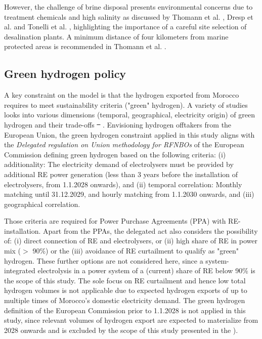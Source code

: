 \documentclass[5p,numafflabel]{elsarticle}
\providecommand{\DIFaddtex}[1]{{\protect\color{blue}\uwave{#1}}} %
\providecommand{\DIFdeltex}[1]{{\protect\color{red}\sout{#1}}}                      %
\providecommand{\DIFaddbegin}{} %
\providecommand{\DIFaddend}{} %
\providecommand{\DIFdelbegin}{} %
\providecommand{\DIFdelend}{} %
\providecommand{\DIFadd}[1]{\texorpdfstring{\DIFaddtex{#1}}{#1}} %
\providecommand{\DIFdel}[1]{\texorpdfstring{\DIFdeltex{#1}}{}} %
\newcommand{\DIFscaledelfig}{0.5}
\newlength{\DIFdelgraphicswidth} %
\newlength{\DIFdelgraphicsheight} %
\newcommand{\DIFaddincludegraphics}[2][]{{\color{blue}\fbox{\DIFOincludegraphics[#1]{#2}}}} %
\newcommand{\DIFdelincludegraphics}[2][]{%
\sbox{\DIFdelgraphicsbox}{\DIFOincludegraphics[#1]{#2}}%
\settoboxwidth{\DIFdelgraphicswidth}{\DIFdelgraphicsbox} %
\settoboxtotalheight{\DIFdelgraphicsheight}{\DIFdelgraphicsbox} %
\scalebox{\DIFscaledelfig}{%
\parbox[b]{\DIFdelgraphicswidth}{\usebox{\DIFdelgraphicsbox}\\[-\baselineskip] \rule{\DIFdelgraphicswidth}{0em}}\llap{\resizebox{\DIFdelgraphicswidth}{\DIFdelgraphicsheight}{%
\setlength{\unitlength}{\DIFdelgraphicswidth}%
\begin{picture}(1,1)%
\thicklines\linethickness{2pt} %
{\color[rgb]{1,0,0}\put(0,0){\framebox(1,1){}}}%
{\color[rgb]{1,0,0}\put(0,0){\line( 1,1){1}}}%
{\color[rgb]{1,0,0}\put(0,1){\line(1,-1){1}}}%
\end{picture}%
}\hspace*{3pt}}} %
} %
\DeclareRobustCommand{\DIFaddbegin}{\DIFOaddbegin \let\includegraphics\DIFaddincludegraphics} %
\DeclareRobustCommand{\DIFaddend}{\DIFOaddend \let\includegraphics\DIFOincludegraphics} %
\DeclareRobustCommand{\DIFdelbegin}{\DIFOdelbegin \let\includegraphics\DIFdelincludegraphics} %
\DeclareRobustCommand{\DIFdelend}{\DIFOaddend \let\includegraphics\DIFOincludegraphics} %
\begin{document}
However, the challenge of brine disposal presents environmental concerns due to treatment chemicals and high salinity as discussed by Thomann et al. \cite{Thomann2022}, Dresp et al. \cite{Dresp2019} and Tonelli et al. \cite{Tonelli2023}, highlighting the importance of a careful site selection of desalination plants. A minimum distance of four kilometers from marine protected areas is recommended in Thomann et al. \cite{Thomann2022}.



\subsection*{Green hydrogen policy}
\label{subsec:green_hydrogen_constraint}


A key constraint on the model is that the hydrogen exported from Morocco requires to meet sustainability criteria ("green" hydrogen). A variety of studies looks into various dimensions (temporal, geographical, electricity origin) of green hydrogen and their trade-offs \DIFdelbegin \DIFdel{\mbox{%
\cite{Brauer2022, Ruhnau2022, Zeyen2024}}\hspace{0pt}%
}\DIFdelend \DIFaddbegin \DIFadd{\mbox{%
\cite{Brauer2022, Ruhnau2023, Zeyen2024}}\hspace{0pt}%
}\DIFaddend .
Envisioning hydrogen offtakers from the European Union, the green hydrogen constraint applied in this study aligns with the \emph{Delegated regulation on Union methodology for RFNBOs} of the European Commission \cite{Commission2023} defining green hydrogen based on the following criteria:
(i) additionality: The electricity demand of electrolysers must be provided by additional RE power generation (less than 3 years before the installation of electrolysers, from 1.1.2028 onwards), and
(ii) temporal correlation: Monthly matching until 31.12.2029, and hourly matching from 1.1.2030 onwards, and
(iii) geographical correlation.

Those criteria are required for Power Purchase Agreements (PPA) with RE-installation. Apart from the PPAs, the delegated act also considers the possibility of:
(i) direct connection of RE and electrolysers, or
(ii) high share of RE in power mix ($>$ 90\%) or the
(iii) avoidance of RE curtailment
to qualify as "green" hydrogen. These further options are not considered here, since a system-integrated electrolysis in a power system of a (current) share of RE below 90\% is the scope of this study. The sole focus on RE curtailment and hence low total hydrogen volumes is not applicable due to expected hydrogen exports of up to multiple times of Morocco's domestic electricity demand. The green hydrogen definition of the European Commission prior to 1.1.2028 is not applied in this study, since relevant volumes of hydrogen export are expected to materialize from 2028 onwards and is excluded by the scope of this study presented in the ).
\end{document}
